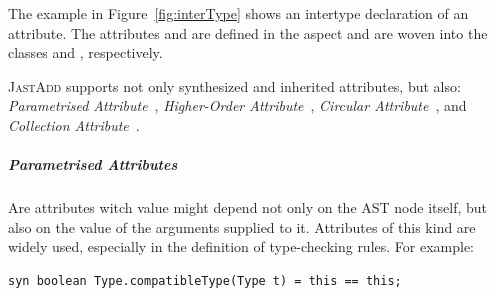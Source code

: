 The example in Figure~\ref{fig:interType}
shows an intertype declaration of an attribute.
The attributes  and  are defined in the aspect 
and are woven into the classes  and , respectively.

\textsc{JastAdd} supports not only synthesized and inherited attributes, but also:
\emph{Parametrised Attribute}~\cite{hedin2000rags}, \emph{Higher-Order Attribute}~\cite{vogt1989higher}, \emph{Circular Attribute}~\cite{MAGNUSSON200721}, and \emph{Collection Attribute}~\cite{Magnusson2007ExtendingAG}.


\subparagraph*{Parametrised Attributes} Are attributes witch value might depend
    not only on the AST node itself, but also on the value of the arguments supplied
    to it. Attributes of this kind are widely used, especially in the definition of
    type-checking rules. For example:
    \begin{lstlisting}[language=JastAdd]
syn boolean Type.compatibleType(Type t) = this == this;
    \end{lstlisting}

